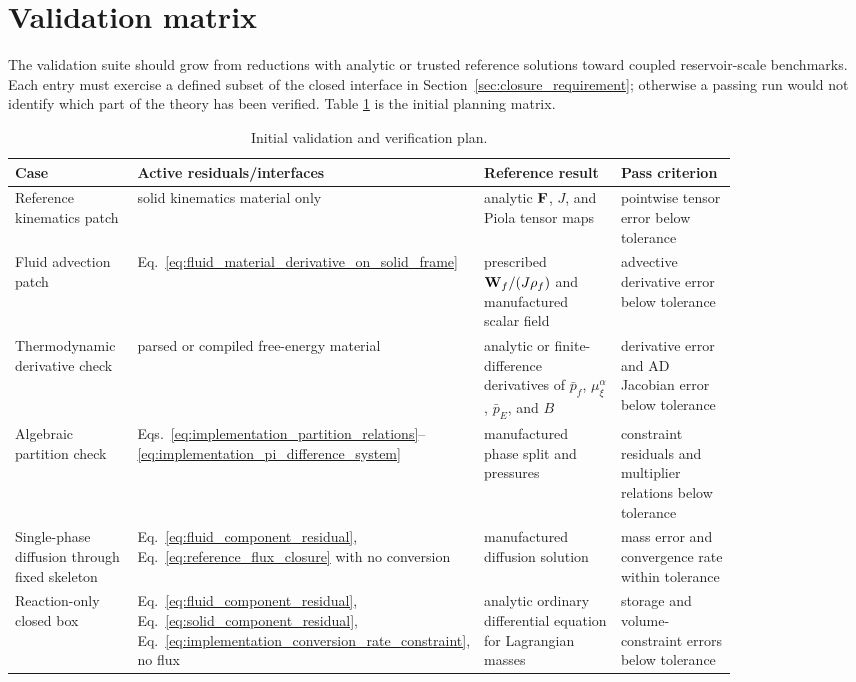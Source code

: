 \section{Validation matrix}
\label{sec:validation_matrix}

The validation suite should grow from reductions with analytic or trusted
reference solutions toward coupled reservoir-scale benchmarks.  Each entry must
exercise a defined subset of the closed interface in
Section~\ref{sec:closure_requirement}; otherwise a passing run would not
identify which part of the theory has been verified.  Table
\ref{tab:validation_matrix} is the initial planning matrix.

\begin{table}[ht]
	\centering
	\caption{Initial validation and verification plan.}
	\label{tab:validation_matrix}
	\small
	\begin{tabular}{p{0.18\linewidth}p{0.22\linewidth}p{0.24\linewidth}p{0.20\linewidth}}
		\toprule
		Case & Active residuals/interfaces & Reference result & Pass criterion \\
		\midrule
		Reference kinematics patch & solid kinematics material only & analytic \(\mathbf{F}\), \(J\), and Piola tensor maps & pointwise tensor error below tolerance \\
		Fluid advection patch & Eq.~\eqref{eq:fluid_material_derivative_on_solid_frame} & prescribed \(\mathbf{W}_f/(J\rho_f)\) and manufactured scalar field & advective derivative error below tolerance \\
		Thermodynamic derivative check & parsed or compiled free-energy material & analytic or finite-difference derivatives of \(\bar p_f\), \(\mu_\xi^\alpha\), \(\bar p_E\), and \(B\) & derivative error and AD Jacobian error below tolerance \\
		Algebraic partition check & Eqs.~\eqref{eq:implementation_partition_relations}--\eqref{eq:implementation_pi_difference_system} & manufactured phase split and pressures & constraint residuals and multiplier relations below tolerance \\
		Single-phase diffusion through fixed skeleton & Eq.~\eqref{eq:fluid_component_residual}, Eq.~\eqref{eq:reference_flux_closure} with no conversion & manufactured diffusion solution & mass error and convergence rate within tolerance \\
		Reaction-only closed box & Eq.~\eqref{eq:fluid_component_residual}, Eq.~\eqref{eq:solid_component_residual}, Eq.~\eqref{eq:implementation_conversion_rate_constraint}, no flux & analytic ordinary differential equation for Lagrangian masses & storage and volume-constraint errors below tolerance \\

\end{tabular}
\end{table}
